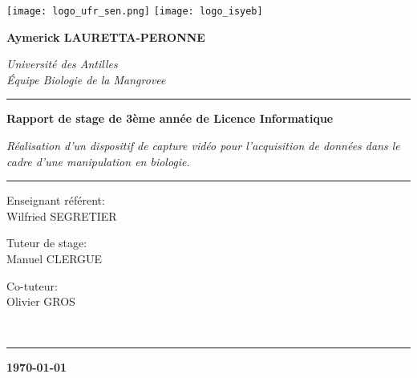 \begin{titlepage}
    \begin{center}

        \texttt{[image: logo\_ufr\_sen.png]}
        \hspace{2cm}
        \texttt{[image: logo\_isyeb]} \\[2cm]
        \hspace{2cm}

        \textbf{\large{Aymerick LAURETTA-PERONNE}} \\

        \vspace{0.5cm}
                
		\textsl{\large{Université des Antilles}} \\[0.1cm]
        \small{\textit{Équipe Biologie de la Mangrovee}} \\[1cm]

        \vspace{1.5cm}

        \rule{\linewidth}{0.5mm}
        \textbf{Rapport de stage de 3ème année de Licence Informatique} 
        
        \vspace{0.5cm}

        \small{\textit{Réalisation d'un dispositif de capture vidéo pour l’acquisition de données dans le cadre d’une manipulation en biologie.}}
        \rule{\linewidth}{0.5mm}

        \vspace{2.5cm}
    
		\begin{minipage}{0.7\textwidth}
			\begin{flushleft}
				Enseignant référent: \\ 
				\hspace{0.2cm} Wilfried \textsc{SEGRETIER}
			\end{flushleft}
		\end{minipage}
        
		\vspace{-0.69cm}
		\hspace{9cm}
		\begin{minipage}{0.3\textwidth}
			\begin{flushleft}
				Tuteur de stage: \\
				\hspace{0.2cm} Manuel \textsc{CLERGUE}

				Co-tuteur: \\
				\hspace{0.2cm} Olivier \textsc{GROS}
			\end{flushleft}
		\end{minipage} \\[2cm]

        \rule{\linewidth}{0.5mm}
        \vfill
        \textbf{\today {}}        
    \end{center}
\end{titlepage}